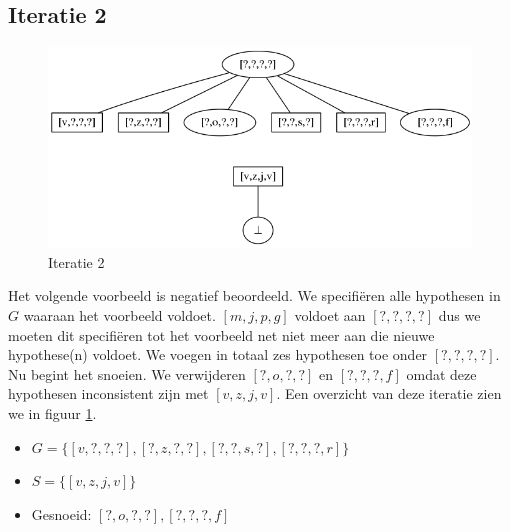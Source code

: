 \documentclass[alternative-exam.tex]{subfiles}
\begin{document}
\subsection{Iteratie 2}
\begin{figure}
[H]
\centering
\caption{Iteratie 2}
\label{iter_2}
\includegraphics[scale=0.5]{resources/graphs/iteration_2.png}
\end{figure}
Het volgende voorbeeld is negatief beoordeeld. We specifi\"eren alle hypothesen in $G$ waaraan het voorbeeld voldoet. $[m,j,p,g]$ voldoet aan $[?,?,?,?]$ dus we moeten dit specifi\"eren tot het voorbeeld net niet meer aan die nieuwe hypothese(n) voldoet. We voegen in totaal zes hypothesen toe onder $[?,?,?,?]$. Nu begint het snoeien. We verwijderen $[?,o,?,?]$ en $[?,?,?,f]$ omdat deze hypothesen inconsistent zijn met $[v,z,j,v]$. Een overzicht van deze iteratie zien we in figuur \ref{iter_2}.
\begin{itemize}
\item $G = \{[v,?,?,?],[?,z,?,?],[?,?,s,?],[?,?,?,r]\}$
\item $S = \{[v,z,j,v]\}$
\item Gesnoeid: $[?,o,?,?],[?,?,?,f]$
\end{itemize}
\end{document}
